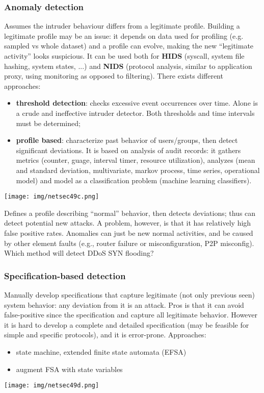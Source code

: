 \documentclass[a4paper, 10pt, titlepage]{article}
\begin{document}
\subsubsection*{Anomaly detection}
Assumes the intruder behaviour differs from a legitimate profile. Building a legitimate profile may be an issue: it depends on data used for profiling (e.g. sampled vs whole dataset) and a profile can evolve, making the new “legitimate activity” looks suspicious.
It can be used both for \textbf{HIDS} (syscall, system file hashing, system states, ...) and \textbf{NIDS} (protocol analysis, similar to application proxy, using monitoring as opposed to filtering). There exists different approaches:
\begin{itemize}
	\item \textbf{threshold detection}: checks excessive event occurrences over time. Alone is a crude and ineffective intruder detector. Both thresholds and time intervals must be determined;
	\item \textbf{profile based}: characterize past behavior of users/groups, then detect significant deviations. It is based on analysis of audit records: it gathers metrics (counter, guage, interval timer, resource utilization), analyzes (mean and standard deviation, multivariate, markov process, time series, operational model) and model as a classification problem (machine learning classifiers).
\end{itemize}
\begin{center}
	\texttt{[image: img/netsec49c.png]}
\end{center}
Defines a profile describing “normal” behavior, then detects deviations; thus can detect potential new attacks. A problem, however, is that it has relatively high false positive rates. Anomalies can just be new normal activities, and be caused by other element faults (e.g., router failure or misconfiguration, P2P misconfig). Which method will detect DDoS SYN flooding?

\subsubsection*{Specification-based detection}
Manually develop specifications that capture legitimate (not only previous seen) system behavior: any deviation from it is an attack. Pros is that it can avoid false-positive since the specification and capture all legitimate behavior. However it is hard to develop a complete and detailed specification (may be feasible for simple and specific protocols), and it is error-prone. Approaches:
\begin{itemize}
	\item state machine, extended finite state automata (EFSA)
	\item augment FSA with state variables
\end{itemize}
\begin{center}
	\texttt{[image: img/netsec49d.png]}
\end{center}
\end{document}
